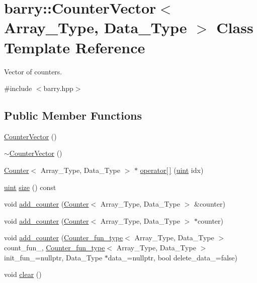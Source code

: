 \hypertarget{classbarry_1_1_counter_vector}{}\section{barry\+:\+:Counter\+Vector$<$ Array\+\_\+\+Type, Data\+\_\+\+Type $>$ Class Template Reference}
\label{classbarry_1_1_counter_vector}


Vector of counters.  




{\ttfamily \#include $<$barry.\+hpp$>$}

\subsection*{Public Member Functions}
\begin{DoxyCompactItemize}
\item 
\hyperlink{classbarry_1_1_counter_vector_a620e7a96ebfd05fe71da6476f27c2850}{Counter\+Vector} ()
\item 
\hyperlink{classbarry_1_1_counter_vector_a6a6cfc7b9a3ff220311d312786a8e3eb}{$\sim$\+Counter\+Vector} ()
\item 
\hyperlink{classbarry_1_1_counter}{Counter}$<$ Array\+\_\+\+Type, Data\+\_\+\+Type $>$ $\ast$ \hyperlink{classbarry_1_1_counter_vector_a6eac3e73298e1e6d424b92f324ffe9a8}{operator\mbox{[}$\,$\mbox{]}} (\hyperlink{namespacebarry_a11dfc53ddb4672278319aa04f1e09a6c}{uint} idx)
\item 
\hyperlink{namespacebarry_a11dfc53ddb4672278319aa04f1e09a6c}{uint} \hyperlink{classbarry_1_1_counter_vector_a05508f97e15d5a6dd2fdefb2d03060de}{size} () const
\item 
void \hyperlink{classbarry_1_1_counter_vector_a34fda06ff678691daf3b0455c1a2af48}{add\+\_\+counter} (\hyperlink{classbarry_1_1_counter}{Counter}$<$ Array\+\_\+\+Type, Data\+\_\+\+Type $>$ \&counter)
\item 
void \hyperlink{classbarry_1_1_counter_vector_a062d52e18f1d3ba4c00cbf4c2d89f1e7}{add\+\_\+counter} (\hyperlink{classbarry_1_1_counter}{Counter}$<$ Array\+\_\+\+Type, Data\+\_\+\+Type $>$ $\ast$counter)
\item 
void \hyperlink{classbarry_1_1_counter_vector_adb32ff1af45bc05a292a5cb064dc414d}{add\+\_\+counter} (\hyperlink{namespacebarry_abaaae3200da8e4b7faac3c04fe9c3081}{Counter\+\_\+fun\+\_\+type}$<$ Array\+\_\+\+Type, Data\+\_\+\+Type $>$ count\+\_\+fun\+\_\+, \hyperlink{namespacebarry_abaaae3200da8e4b7faac3c04fe9c3081}{Counter\+\_\+fun\+\_\+type}$<$ Array\+\_\+\+Type, Data\+\_\+\+Type $>$ init\+\_\+fun\+\_\+=nullptr, Data\+\_\+\+Type $\ast$data\+\_\+=nullptr, bool delete\+\_\+data\+\_\+=false)
\item 
void \hyperlink{classbarry_1_1_counter_vector_acce75748f917e3a7898d49a23df996e7}{clear} ()
\end{DoxyCompactItemize}


